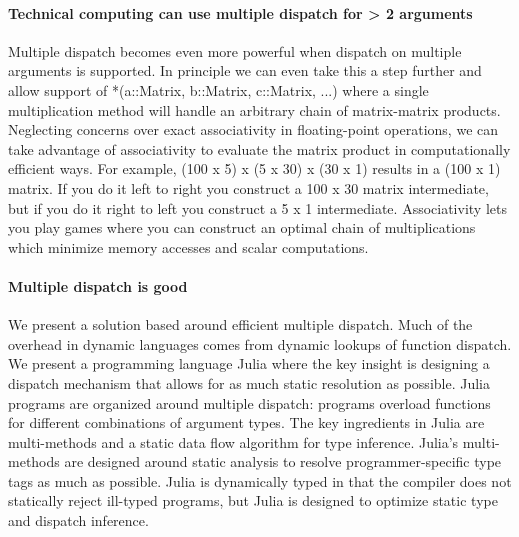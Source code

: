 \documentclass[pldi]{sigplanconf-pldi15}
\begin{document}
\paragraph{Technical computing can use multiple dispatch for > 2 arguments}
Multiple dispatch becomes even more powerful when dispatch on multiple
arguments is supported. In principle we can even take this a step further and
allow support of *(a::Matrix, b::Matrix, c::Matrix, ...) where a single
multiplication method will handle an arbitrary chain of matrix-matrix products.
Neglecting concerns over exact associativity in floating-point operations, we
can take advantage of associativity to evaluate the matrix product in
computationally efficient ways. For example, (100 x 5) x (5 x 30) x (30 x 1)
results in a (100 x 1) matrix. If you do it left to right you construct a 100 x
30 matrix intermediate, but if you do it right to left you construct a 5 x 1
intermediate. Associativity lets you play games where you can construct an
optimal chain of multiplications which minimize memory accesses and scalar
computations.
 

\paragraph{Multiple dispatch is good}
We present a solution based around efficient multiple dispatch.  Much of the
overhead in dynamic languages comes from dynamic lookups of function dispatch.
 We present a programming language Julia where the
key insight is designing a dispatch mechanism that allows for as much static
resolution as possible.  Julia programs are organized around multiple dispatch:
programs overload functions for different combinations of argument types.  The
key ingredients in Julia are multi-methods and a static data flow algorithm for
type inference.  Julia's multi-methods are designed around static analysis to
resolve programmer-specific type tags as much as possible.  Julia is
dynamically typed in that the compiler does not statically reject ill-typed
programs, but Julia is designed to optimize static type and dispatch inference.
\end{document}

